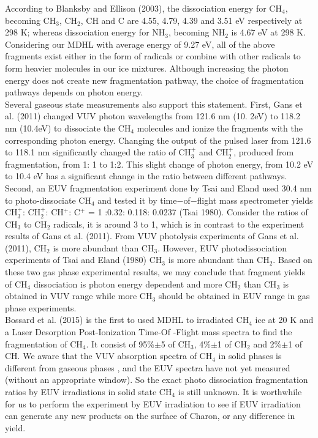 According to Blanksby and Ellison (2003), the dissociation energy for CH$_4$, becoming CH$_3$, CH$_2$, CH and C are 4.55, 4.79, 4.39 and 3.51 eV respectively at 298 K; whereas dissociation energy for NH$_3$, becoming NH$_2$ is 4.67 eV at 298 K\cite{blanksby2003bond}.\\

Considering our MDHL with average energy of 9.27 eV, all of the above fragments exist either in the form of radicals or combine with other radicals to form heavier molecules in our ice mixtures. Although increasing the photon energy does not create new fragmentation pathway, the choice of fragmentation pathways depends on photon energy.\\

Several gaseous state measurements also support this statement. First, Gans et al. (2011) \cite{gans2011photolysis} changed VUV photon wavelengths from 121.6 nm (10. 2eV) to 118.2 nm (10.4eV) to dissociate the CH$_4$ molecules and ionize the fragments with the corresponding photon energy. Changing the output of the pulsed laser from 121.6 to 118.1 nm significantly changed the ratio of CH$_3^+$ and CH$_2^+$, produced from fragmentation, from 1: 1 to 1:2. This slight change of photon energy, from 10.2 eV to 10.4 eV has a significant change in the ratio between different pathways.\\

Second, an EUV fragmentation experiment done by Tsai and Eland \cite{tsai1980mass} used 30.4 nm to photo-dissociate CH$_4$ and tested it by time$-$of$-$flight mass spectrometer yields CH$_3^+$: CH$_2^+$: CH$^+$: C$^+$ = 1 :0.32: 0.118: 0.0237 (Tsai 1980). Consider the ratios of CH$_3$ to CH$_2$ radicals, it is around 3 to 1, which is in contrast to the experiment results of Gans et al. (2011)\cite{gans2011photolysis}. From VUV photolysis experiments of Gans et al. (2011)\cite{gans2011photolysis}, CH$_2$ is more abundant than CH$_3$. However, EUV photodissociation experiments of Tsai and Eland (1980)\cite{tsai1980mass} CH$_3$ is more abundant than CH$_2$. Based on these two gas phase experimental results, we may conclude that fragment yields of CH$_4$ dissociation is photon energy dependent and more CH$_2$ than CH$_3$ is obtained in VUV range while more CH$_3$ should be obtained in EUV range in gas phase experiments.\\

Bossard et al. (2015) \cite{bossard2015methane} is the first to used MDHL to irradiated CH$_4$ ice at 20 K and a Laser Desorption Post-Ionization Time-Of -Flight mass spectra to find the fragmentation of CH$_4$. It consist of 95\%$\pm$5 of CH$_3$, 4\%$\pm$1 of CH$_2$ and 2\%$\pm$1 of CH. We aware that the VUV absorption spectra of CH$_4$ in solid phases is different from gaseous phases \cite{cruz2014nonpolar}, and the EUV spectra have not yet measured (without an appropriate window). So the exact photo dissociation fragmentation ratios by EUV irradiations in solid state CH$_4$ is still unknown. It is worthwhile for us to perform the experiment by EUV irradiation to see if EUV irradiation can generate any new products on the surface of Charon, or any difference in yield.\\

